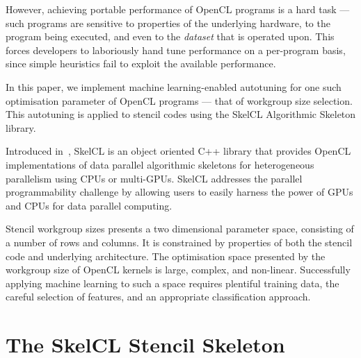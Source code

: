 \documentclass[nonatbib,preprint,10pt]{sigplanconf}
\begin{document}
 However, achieving portable performance of
OpenCL programs is a hard task --- such programs are sensitive to
properties of the underlying hardware, to the program being executed,
and even to the \emph{dataset} that is operated upon. This forces
developers to laboriously hand tune performance on a per-program
basis, since simple heuristics fail to exploit the available
performance.


In this paper, we implement machine learning-enabled autotuning for
one such optimisation parameter of OpenCL programs --- that of
workgroup size selection. This autotuning is applied to stencil codes
using the SkelCL Algorithmic Skeleton library.


Introduced in~\cite{Steuwer2011}, SkelCL is an object oriented C++
library that provides OpenCL implementations of data parallel
algorithmic skeletons for heterogeneous parallelism using CPUs or
multi-GPUs. SkelCL addresses the parallel programmability challenge by
allowing users to easily harness the power of GPUs and CPUs for data
parallel computing.

Stencil workgroup sizes presents a two dimensional parameter space,
consisting of a number of rows and columns. It is constrained by
properties of both the stencil code and underlying architecture. The
optimisation space presented by the workgroup size of OpenCL kernels
is large, complex, and non-linear. Successfully applying machine
learning to such a space requires plentiful training data, the careful
selection of features, and an appropriate classification approach.


\section{The SkelCL Stencil Skeleton}
\end{document}
